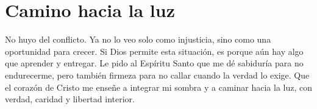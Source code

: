 \documentclass[12pt]{article}
\begin{document}
\section*{Camino hacia la luz}

No huyo del conflicto. Ya no lo veo solo como injusticia, sino como una oportunidad para crecer. Si Dios permite esta situación, es porque aún hay algo que aprender y entregar. Le pido al Espíritu Santo que me dé sabiduría para no endurecerme, pero también firmeza para no callar cuando la verdad lo exige. Que el corazón de Cristo me enseñe a integrar mi sombra y a caminar hacia la luz, con verdad, caridad y libertad interior.
\end{document}
